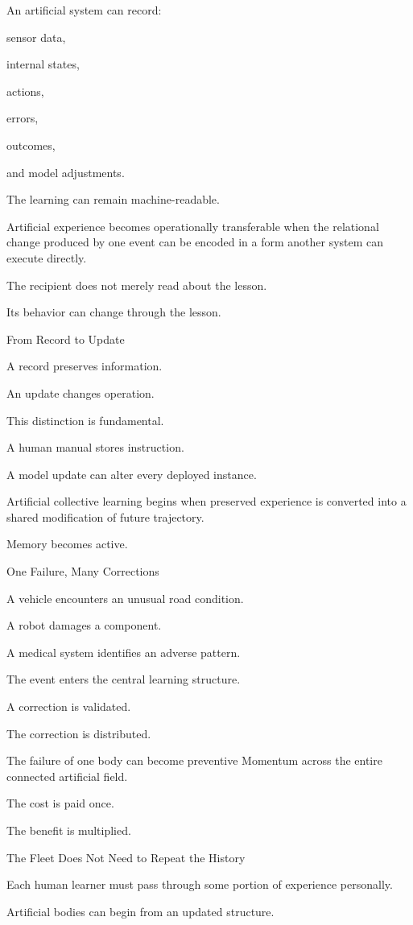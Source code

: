 An artificial system can record:

sensor data,

internal states,

actions,

errors,

outcomes,

and model adjustments.

The learning can remain machine-readable.

Artificial experience becomes operationally transferable when the relational change produced by one event can be encoded in a form another system can execute directly.

The recipient does not merely read about the lesson.

Its behavior can change through the lesson.

From Record to Update

A record preserves information.

An update changes operation.

This distinction is fundamental.

A human manual stores instruction.

A model update can alter every deployed instance.

Artificial collective learning begins when preserved experience is converted into a shared modification of future trajectory.

Memory becomes active.

One Failure, Many Corrections

A vehicle encounters an unusual road condition.

A robot damages a component.

A medical system identifies an adverse pattern.

The event enters the central learning structure.

A correction is validated.

The correction is distributed.

The failure of one body can become preventive Momentum across the entire connected artificial field.

The cost is paid once.

The benefit is multiplied.

The Fleet Does Not Need to Repeat the History

Each human learner must pass through some portion of experience personally.

Artificial bodies can begin from an updated structure.

